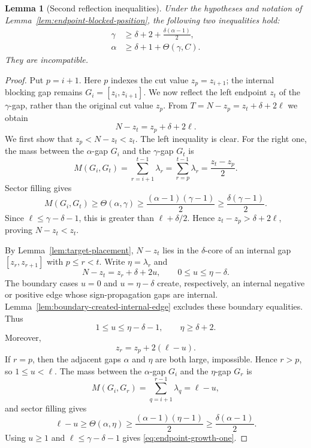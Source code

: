 \documentclass[10pt,a4paper]{amsart}
\newtheorem{lemma}{Lemma}
\begin{document}
\begin{lemma}[Second reflection inequalities]\label{lem:endpoint-blocked-growth}
Under the hypotheses and notation of Lemma~\ref{lem:endpoint-blocked-position}, the following two inequalities hold:
\begin{align}
        \gamma&\ge \delta+2+\frac{\delta(\alpha-1)}2,
        \label{eq:endpoint-growth-one}\\
        \alpha&\ge \delta+1+\Theta(\gamma,C).
        \label{eq:endpoint-growth-two}
\end{align}
They are incompatible.
\end{lemma}

\begin{proof}
Put $p=i+1$.  Here $p$ indexes the cut value $z_p=z_{i+1}$; the internal blocking gap remains $G_i=[z_i,z_{i+1}]$.  We now reflect the left endpoint $z_t$ of the $\gamma$-gap, rather than the original cut value $z_p$.  From $T=N-z_p=z_t+\delta+2\ell$ we obtain
\[
        N-z_t=z_p+\delta+2\ell.
\]
We first show that $z_p<N-z_t<z_t$.  The left inequality is clear.  For the right one, the mass between the $\alpha$-gap $G_i$ and the $\gamma$-gap $G_t$ is
\[
        M(G_i,G_t)=\sum_{r=i+1}^{t-1}\lambda_r=\sum_{r=p}^{t-1}\lambda_r=\frac{z_t-z_p}{2}.
\]
Sector filling gives
\[
        M(G_i,G_t)
        \ge \Theta(\alpha,\gamma)
        \ge \frac{(\alpha-1)(\gamma-1)}2
        \ge \frac{\delta(\gamma-1)}2.
\]
Since $\ell\le\gamma-\delta-1$, this is greater than $\ell+\delta/2$.  Hence $z_t-z_p>\delta+2\ell$, proving $N-z_t<z_t$.

By Lemma~\ref{lem:target-placement}, $N-z_t$ lies in the $\delta$-core of an internal gap $[z_r,z_{r+1}]$ with $p\le r<t$.  Write $\eta=\lambda_r$ and
\[
        N-z_t=z_r+\delta+2u,
        \qquad
        0\le u\le \eta-\delta.
\]
The boundary cases $u=0$ and $u=\eta-\delta$ create, respectively, an internal negative or positive edge whose sign-propagation gaps are internal.  Lemma~\ref{lem:boundary-created-internal-edge} excludes these boundary equalities.  Thus
\[
        1\le u\le\eta-\delta-1,
        \qquad
        \eta\ge\delta+2.
\]
Moreover,
\[
        z_r=z_p+2(\ell-u).
\]
If $r=p$, then the adjacent gaps $\alpha$ and $\eta$ are both large, impossible.  Hence $r>p$, so $1\le u<\ell$.  The mass between the $\alpha$-gap $G_i$ and the $\eta$-gap $G_r$ is
\[
        M(G_i,G_r)=\sum_{q=i+1}^{r-1}\lambda_q=\ell-u,
\]
and sector filling gives
\[
        \ell-u\ge\Theta(\alpha,\eta)
        \ge\frac{(\alpha-1)(\eta-1)}2
        \ge\frac{\delta(\alpha-1)}2.
\]
Using $u\ge1$ and $\ell\le\gamma-\delta-1$ gives \eqref{eq:endpoint-growth-one}.


\end{proof}
\end{document}
